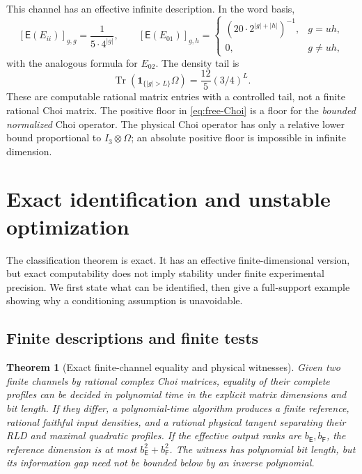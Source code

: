 \documentclass[11pt,reqno]{amsart}
\newtheorem{theorem}{Theorem}[section]
\theoremstyle{definition}
\theoremstyle{remark}
\numberwithin{equation}{section}
\DeclareMathOperator{\Tr}{Tr}
\newcommand{\E}{\mathsf E}
\newcommand{\F}{\mathsf F}
\newcommand{\one}{\mathbf 1}
\begin{document}
This channel has an effective infinite description. In the word basis,
\[
 [\E(E_{ii})]_{g,g}=\frac1{5\cdot4^{|g|}},\qquad
 [\E(E_{01})]_{g,h}=
 \begin{cases}
 (20\cdot2^{|g|+|h|})^{-1},&g=uh,\\0,&g\ne uh,
 \end{cases}
\]
with the analogous formula for $E_{02}$. The density tail is
\[
 \Tr(\one_{\{|g|>L\}}\Omega)=\frac{12}{5}(3/4)^L.
\]
These are computable rational matrix entries with a controlled tail, not a finite rational Choi matrix. The positive floor in \eqref{eq:free-Choi} is a floor for the \emph{bounded normalized} Choi operator. The physical Choi operator has only a relative lower bound proportional to $I_3\otimes\Omega$; an absolute positive floor is impossible in infinite dimension.



\section{Exact identification and unstable optimization}\label{sec:stability}

The classification theorem is exact. It has an effective finite-dimensional version, but exact computability does not imply stability under finite experimental precision. We first state what can be identified, then give a full-support example showing why a conditioning assumption is unavoidable.

\subsection{Finite descriptions and finite tests}

\begin{theorem}[Exact finite-channel equality and physical witnesses]\label{thm:algorithm}
Given two finite channels by rational complex Choi matrices, equality of their complete profiles can be decided in polynomial time in the explicit matrix dimensions and bit length. If they differ, a polynomial-time algorithm produces a finite reference, rational faithful input densities, and a rational physical tangent separating their RLD and maximal quadratic profiles. If the effective output ranks are $b_\E,b_\F$, the reference dimension is at most $b_\E^2+b_\F^2$. The witness has polynomial bit length, but its information gap need not be bounded below by an inverse polynomial.
\end{theorem}
\end{document}
